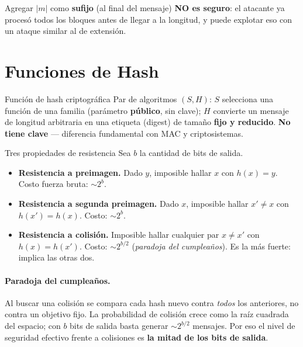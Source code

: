 \documentclass[11pt,a4paper]{article}
\begin{document}
\begin{ojo}
Agregar $|m|$ como \textbf{sufijo} (al final del mensaje) \textbf{NO es seguro}:
el atacante ya proces\'o todos los bloques antes de llegar a la longitud, y puede
explotar eso con un ataque similar al de extensi\'on.
\end{ojo}

\section{Funciones de Hash}

\begin{definicion}{Funci\'on de hash criptogr\'afica}
Par de algoritmos $(S,H)$: $S$ selecciona una funci\'on de una familia
(par\'ametro \textbf{p\'ublico}, sin clave); $H$ convierte un mensaje de longitud
arbitraria en una etiqueta (digest) de tama\~no \textbf{fijo y reducido}.
\textbf{No tiene clave} --- diferencia fundamental con MAC y criptosistemas.
\end{definicion}

\begin{definicion}{Tres propiedades de resistencia}
Sea $b$ la cantidad de bits de salida.
\begin{itemize}[leftmargin=1.4em,nosep]
  \item \textbf{Resistencia a preimagen.}  Dado $y$, imposible hallar $x$ con $h(x)=y$.
        Costo fuerza bruta: $\sim 2^{b}$.
  \item \textbf{Resistencia a segunda preimagen.}  Dado $x$, imposible hallar $x'\neq x$
        con $h(x')=h(x)$.  Costo: $\sim 2^{b}$.
  \item \textbf{Resistencia a colisi\'on.}  Imposible hallar cualquier par $x\neq x'$
        con $h(x)=h(x')$.  Costo: $\sim 2^{b/2}$ (\emph{paradoja del cumplea\~nos}).
        Es la m\'as fuerte: implica las otras dos.
\end{itemize}
\end{definicion}

\paragraph{Paradoja del cumplea\~nos.}  Al buscar una colisi\'on se compara cada
hash nuevo contra \emph{todos} los anteriores, no contra un objetivo fijo.  La
probabilidad de colisi\'on crece como la ra\'iz cuadrada del espacio; con $b$ bits
de salida basta generar $\sim 2^{b/2}$ mensajes.  Por eso el nivel de seguridad
efectivo frente a colisiones es \textbf{la mitad de los bits de salida}.
\end{document}
